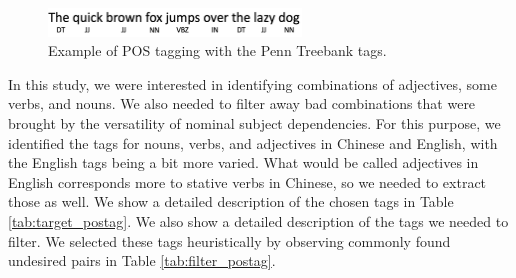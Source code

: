 \documentclass[smallextended,natbib]{svjour3}       %
\begin{document}
    \begin{figure}[ht]
    \centering
    \includegraphics[width=0.6\textwidth]{postag.png}
    \caption{Example of POS tagging with the Penn Treebank tags.}
    \label{fig:postag}
    \end{figure}

    In this study, we were interested in identifying combinations of adjectives, some verbs, and nouns. We also needed to filter away bad combinations that were brought by the versatility of nominal subject dependencies. For this purpose, we identified the tags for nouns, verbs, and adjectives in Chinese and English, with the English tags being a bit more varied. What would be called adjectives in English corresponds more to stative verbs in Chinese, so we needed to extract those as well. We show a detailed description of the chosen tags in Table \ref{tab:target_postag}. We also show a detailed description of the tags we needed to filter. We selected these tags heuristically by observing commonly found undesired pairs in Table \ref{tab:filter_postag}.
\end{document}
